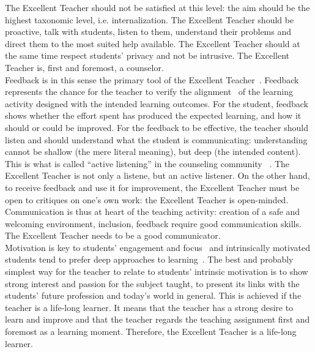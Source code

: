 \documentclass[
  a4paper, 
]{fortysecondscv}
\begin{document}
\newpage
\makebacksidebar
\hrulefill\hspace{5pt}\textbf{\thepage}

The Excellent Teacher should not be satisfied at this level: the aim should be the highest taxonomic level, i.e. internalization. The Excellent Teacher should be proactive, talk with students, listen to them, understand their problems and direct them to the most suited help available. The Excellent Teacher should at the same time respect students’ privacy and not be intrusive. The Excellent Teacher is, first and foremost, a counselor.\\
Feedback is in this sense the primary tool of the Excellent Teacher~\cite{elmgren2015}. Feedback represents the chance for the teacher to verify the alignment~\cite{elmgren2015} of the learning activity designed with the intended learning outcomes. For the student, feedback shows whether the effort spent has produced the expected learning, and how it should or could be improved. For the feedback to be effective, the teacher should listen and should understand what the student is communicating: understanding cannot be shallow (the mere literal meaning), but deep (the intended content). This is what is called “active listening” in the counseling community~\cite{knights1985,robertson2005} . The Excellent Teacher is not only a listene, but an active listener. On the other hand, to receive feedback and use it for improvement, the Excellent Teacher must be open to critiques on one's own work: the Excellent Teacher is open-minded.\\
Communication is thus at heart of the teaching activity: creation of a safe and welcoming environment, inclusion, feedback require good communication skills. The Excellent Teacher needs to be a good communicator.\\
Motivation is key to students’ engagement and focus~\cite{rust2013,ariely2008,yeager2014} and intrinsically motivated students tend to prefer deep approaches to learning~\cite{rust2013,yeager2014}. The best and probably simplest way for the teacher to relate to students’ intrinsic motivation is to show strong interest and passion for the subject taught, to present its links with the students’ future profession and today's world in general. This is achieved if the teacher is a life-long learner. It means that the teacher has a strong desire to learn and improve and that the teacher regards the teaching assignment first and foremost as a learning moment. Therefore, the Excellent Teacher is a life-long learner.\\
\end{document}
